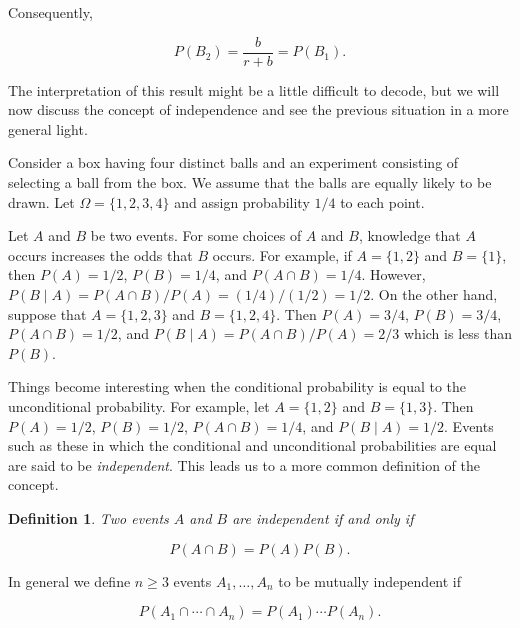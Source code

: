 \documentclass{article}
\theoremstyle{definition}
\newtheorem{definition}{Definition}[section]
\theoremstyle{remark}
\theoremstyle{definition}
\begin{document}
    Consequently,
    
    \begin{equation*}
        P(B_2)=\frac{b}{r+b}=P(B_1).
    \end{equation*}
    
    \noindent The interpretation of this result might be a little difficult to decode, but we will now discuss the concept of independence and see the previous situation in a more general light.\par Consider a box having four distinct balls and an experiment consisting of selecting a ball from the box. We assume that the balls are equally likely to be drawn. Let $\Omega=\{1,2,3,4\}$ and assign probability $1/4$ to each point.\par Let $A$ and $B$ be two events. For some choices of $A$ and $B$, knowledge that $A$ occurs increases the odds that $B$ occurs. For example, if $A=\{1,2\}$ and $B=\{1\}$, then $P(A)=1/2$, $P(B)=1/4$, and $P(A\cap B)=1/4$. However, $P(B\mid A)=P(A\cap B)/P(A)=(1/4)/(1/2)=1/2$. On the other hand, suppose that $A=\{1,2,3\}$ and $B=\{1,2,4\}$. Then $P(A)=3/4$, $P(B)=3/4$, $P(A\cap B)=1/2$, and $P(B\mid A)=P(A\cap B)/P(A)=2/3$ which is less than $P(B)$.\par Things become interesting when the conditional probability is equal to the unconditional probability. For example, let $A=\{1,2\}$ and $B=\{1,3\}$. Then $P(A)=1/2$, $P(B)=1/2$, $P(A\cap B)=1/4$, and $P(B\mid A)=1/2$. Events such as these in which the conditional and unconditional probabilities are equal are said to be \textit{independent}. This leads us to a more common definition of the concept.
    
    \begin{definition}
        \textit{Two events $A$ and $B$ are independent if and only if}
        
        \begin{equation*}
            P(A\cap B)=P(A)P(B).
        \end{equation*}
    \end{definition}
    
    \noindent In general we define $n\geq 3$ events $A_1, \dots, A_n$ to be mutually independent if 
    
    \begin{equation*}
        P(A_1\cap\cdots\cap A_n)=P(A_1)\cdots P(A_n).
    \end{equation*}
    
\end{document}

